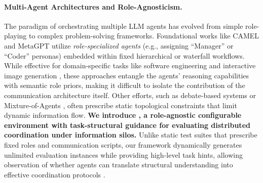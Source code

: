 \paragraph{Multi-Agent Architectures and Role-Agnosticism.}
The paradigm of orchestrating multiple LLM agents has evolved from simple role-playing to complex problem-solving frameworks. 
Foundational works like CAMEL \citep{li2023camel} and MetaGPT \citep{hong2023metagpt} utilize \textit{role-specialized agents} (e.g., assigning ``Manager'' or ``Coder'' personas) embedded within fixed hierarchical or waterfall workflows. 
While effective for domain-specific tasks like software engineering \citep{islam2024mapcoder} and interactive image generation \citep{ma2025talk2image}, these approaches entangle the agents' reasoning capabilities with semantic role priors, making it difficult to isolate the contribution of the communication architecture itself. 
Other efforts, such as debate-based systems \citep{du2023improving} or Mixture-of-Agents \citep{wangmixture,su2026daao}, often prescribe static topological constraints that limit dynamic information flow. 
\textbf{We introduce \silobench{}, a role-agnostic configurable environment with task-structural guidance for evaluating distributed coordination under information silos.} 
Unlike static test suites that prescribe fixed roles and communication scripts, our framework dynamically generates unlimited evaluation instances while providing high-level task hints, allowing observation of whether agents can translate structural understanding into effective coordination protocols \cite{presstrain,liuagentbench}.



